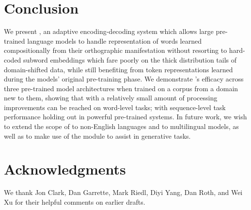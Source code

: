 \section{Conclusion}
\label{sec:conclusion}

We present \tokdetok{}, an adaptive encoding-decoding system which allows large pre-trained language models to handle representation of words learned compositionally from their orthographic manifestation without resorting to hard-coded subword embeddings which fare poorly on the thick distribution tails of domain-shifted data, while still benefiting from token representations learned during the models' original pre-training phase.
We demonstrate \tokdetok{}'s efficacy across three pre-trained model architectures when trained on a corpus from a domain new to them, showing that with a relatively small amount of processing improvements can be reached on word-level tasks; with sequence-level task performance holding out in powerful pre-trained systems.
In future work, we wish to extend the scope of \tokdetok{} to non-English languages and to multilingual models, as well as to make use of the \detok{} module to assist in generative tasks.


\section*{Acknowledgments}
We thank Jon Clark, Dan Garrette, Mark Riedl, Diyi Yang, Dan Roth, and Wei Xu for their helpful comments on earlier drafts.

